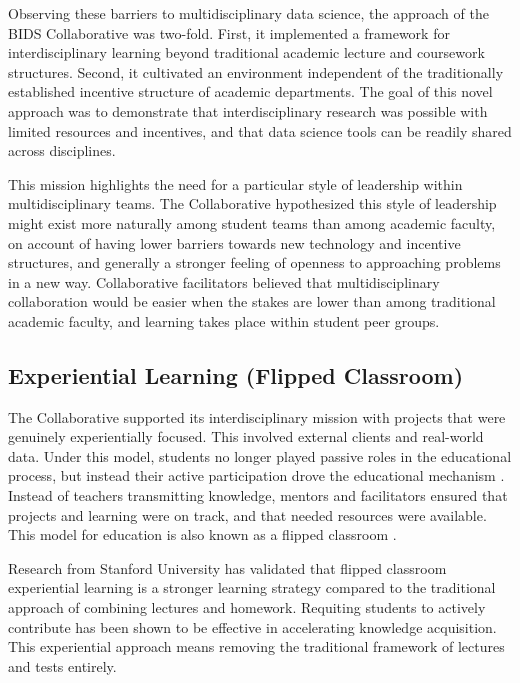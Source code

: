 \documentclass[12pt]{article}
\begin{document}
Observing these barriers to multidisciplinary data science, the approach of the BIDS Collaborative was two-fold. First, it implemented a framework for interdisciplinary learning beyond traditional academic lecture and coursework structures. Second, it cultivated an environment independent of the traditionally established incentive structure of academic departments. The goal of this novel approach was to demonstrate that interdisciplinary research was possible with limited resources and incentives, and that data science tools can be readily shared across disciplines.

This mission highlights the need for a particular style of leadership within multidisciplinary teams.  The Collaborative hypothesized this style of leadership might exist more naturally among student teams than among academic faculty, on account of having lower barriers towards new technology and incentive structures, and generally a stronger feeling of openness to approaching problems in a new way.  Collaborative facilitators believed that multidisciplinary collaboration would be easier when the stakes are lower than among traditional academic faculty, and learning takes place within student peer groups.

\subsection{Experiential Learning (Flipped Classroom)}

The Collaborative supported its interdisciplinary mission with projects that were genuinely experientially focused.  This involved external clients and real-world data. Under this model, students no longer played passive roles in the educational process, but instead their active participation drove the educational mechanism \citep{beard2010experiential}. Instead of teachers transmitting knowledge, mentors and facilitators ensured that projects and learning were on track, and that needed resources were available. This model for education is also known as a flipped classroom \citep{Horn2013}.

Research from Stanford University \citep{plotnikoff_classes_2013} has validated that flipped classroom experiential learning is a stronger learning strategy compared to the traditional approach of combining lectures and homework. Requiting students to actively contribute has been shown to be effective in accelerating knowledge acquisition. This experiential approach means removing the traditional framework of lectures and tests entirely. 
\end{document}
